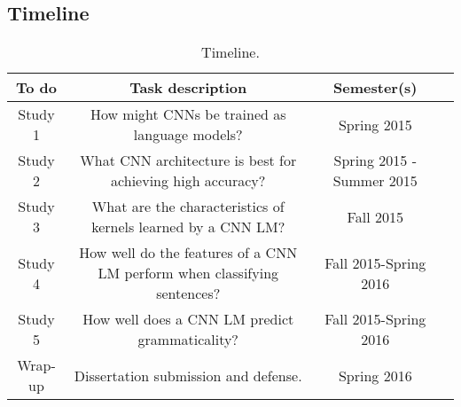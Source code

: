 \begin{itemize}








\section{Timeline}
\label{sec:timeline}

\begin{table}
\centering
\begin{tabular}{c|c|c|c} 
\hline
To do & Task description & Semester(s) \\
\hline
Study 1 & \parbox{6cm}{How might CNNs be trained as language models?} & Spring 2015 \\
\hline
Study 2 & \parbox{6cm}{What CNN architecture is best for achieving high accuracy?} & Spring 2015 - Summer 2015 \\
\hline
Study 3 & \parbox{6cm}{What are the characteristics of kernels learned by a CNN LM?} & Fall 2015 \\
\hline
Study 4 & \parbox{6cm}{How well do the features of a CNN LM perform when classifying sentences?} & Fall 2015-Spring 2016 \\
\hline
Study 5 & \parbox{6cm}{How well does a CNN LM predict grammaticality?} & Fall 2015-Spring 2016 \\
\hline
Wrap-up & Dissertation submission and defense. & Spring 2016 \\
\hline
\end{tabular}
\caption{Timeline.}
\label{tab:studies}
\end{table}


\end{itemize}
